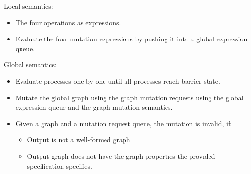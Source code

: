 \begin{frame}
Local semantics:\\
\begin{itemize}
  \item The four operations as expressions.
  \item Evaluate the four mutation expressions by pushing it into a global
  expression queue.
\end{itemize}

Global semantics:\\
\begin{itemize}
  \item Evaluate processes one by one until all processes reach barrier state.
  \item Mutate the global graph using the graph mutation requests using the
  global expression queue and the graph mutation semantics.
  \item Given a graph and a mutation request queue, the mutation is invalid, if:
  \begin{itemize}
    \item Output is not a well-formed graph
    \item Output graph does not have the graph properties the
    provided specification specifies.
  \end{itemize}
\end{itemize}


\end{frame}



